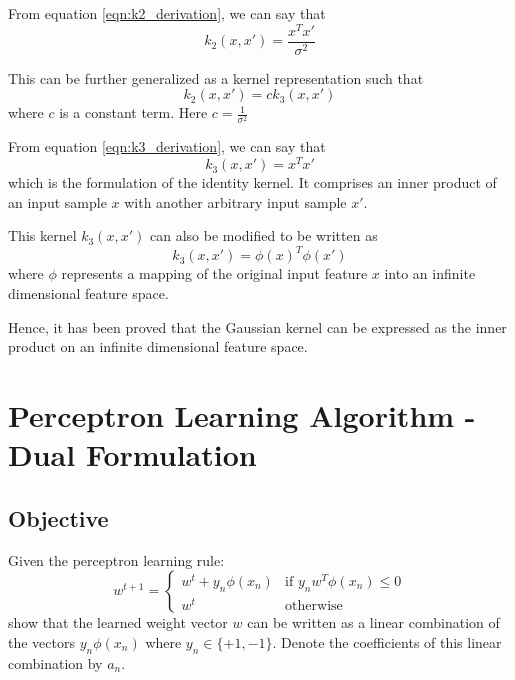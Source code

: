 \documentclass[parskip=full]{scrartcl}
\begin{document}
        From equation \ref{eqn:k2_derivation}, we can say that
        $$k_2(x, x\prime) = \frac{x^Tx\prime}{\sigma^2}$$

        This can be further generalized as a kernel representation such that
        \begin{equation} \label{eqn:k3_derivation}
            k_2(x, x\prime) = c k_3(x, x\prime)
        \end{equation}
        where $c$ is a constant term. Here $c = \frac{1}{\sigma^2}$

        From equation \ref{eqn:k3_derivation}, we can say that
        $$k_3(x, x\prime) = x^Tx\prime$$
        which is the formulation of the identity kernel. It comprises an inner product of an input sample $x$ with another arbitrary input sample $x\prime$.

        This kernel $k_3(x, x\prime)$ can also be modified to be written as 
        \begin{equation}
            \boxed{
                k_3(x, x\prime) = \phi(x)^T\phi(x\prime)
            }
        \end{equation}
        where $\phi$ represents a mapping of the original input feature $x$ into an infinite dimensional feature space.

        Hence, it has been proved that the Gaussian kernel can be expressed as the inner product on an infinite dimensional feature space.
    



\newpage


\section{Perceptron Learning Algorithm - Dual Formulation} %
\label{sec:perceptron_learning_algorithm_dual_formulation}

    \subsection*{Objective} %
    \label{sub:objective_2}

        Given the perceptron learning rule:
        \begin{equation} \label{eqn:orig_perceptron_learning_rule}
            w^{t+1} = 
            \begin{cases}
                w^t + y_n \phi(x_n) & \text{if } y_n w^T \phi(x_n) \leq 0 \\
                w^t                 & \text{otherwise}
            \end{cases}
        \end{equation}
        show that the learned weight vector $w$ can be written as a linear combination of the vectors $y_n \phi(x_n)$ where $y_n \in \{+1, -1\}$. Denote the coefficients of this linear combination by $a_n$.
\end{document}

